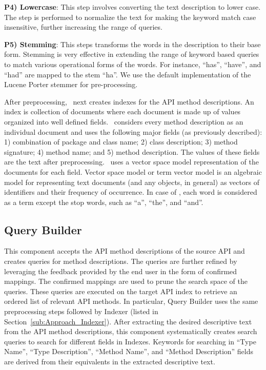 \textbf{P4) Lowercase}: This step involves converting the text description to lower case. The step is performed to normalize the text for making the keyword match case insensitive, further increasing the range of queries.
	
\textbf{P5) Stemming}: This steps transforms the words in the description to their base form. Stemming is very effective in extending the range of keyword based queries to match various operational forms of the words. For instance, ``has'', ``have'', and ``had'' are mapped to the stem ``ha''. We use the default implementation of the Lucene Porter stemmer for pre-processing. 
	


After preprocessing, \tool\ next creates indexes for the API method descriptions.
An index is collection of documents where each document is made up of 
values organized into well defined fields.
\tool\ considers every method description as an individual document and 
uses the following major fields (as previously described):
1) combination of package and class name;
2) class description;
3) method signature;
4) method name; and
5) method description.
The values of these fields are the text after preprocessing.
\tool\ uses a vector space model representation of the documents for each field. 
Vector space model or term vector model is an algebraic model for representing text documents (and any objects, in general) as vectors of identifiers and their frequency of occurrence. 
In case of \tool, each word is considered as a term except the stop words, such as ``a'', ``the'', and ``and''.


  

\subsection{Query Builder}
\label{sub:Approach_Searcher}

This component accepts the API method descriptions of the source API
and creates queries for method descriptions.
The queries are further refined by leveraging the feedback provided by the end user in the form of confirmed mappings.
The confirmed mappings are used to prune the search space of the queries.
These queries are executed on the target API index to retrieve 
an ordered list of relevant API methods.
In particular, Query Builder uses the same preprocessing steps followed by Indexer
(listed in Section~\ref{sub:Approach_Indexer}).
After extracting the desired descriptive text from the API method descriptions,
this component systematically creates search queries to search for different fields in Indexes.
Keywords for searching in ``Type Name'', ``Type Description'', ``Method Name'', and ``Method Description'' fields are derived from their equivalents in the extracted descriptive text.



